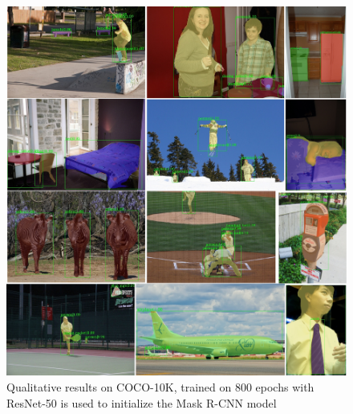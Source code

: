 \begin{figure}[htbp]
\includegraphics[width=1.0\linewidth]{figures/coco_vis.pdf}
\fi
\caption{Qualitative results on COCO-10K, \ours{} trained on 800 epochs with ResNet-50 is used to
initialize the Mask R-CNN model}
\label{fig:coco_vis}
\end{figure}


\newpage
